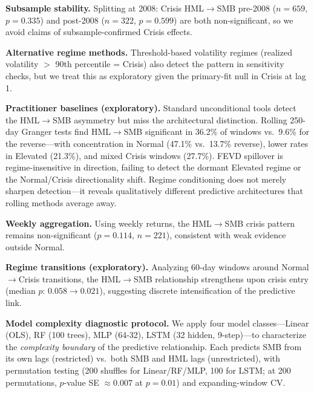 \documentclass[sigconf,anonymous]{acmart}
\begin{document}
\textbf{Subsample stability.} Splitting at 2008: Crisis HML$\to$SMB
pre-2008 ($n = 659$, $p = 0.335$) and post-2008 ($n = 322$, $p = 0.599$)
are both non-significant, so we avoid claims of subsample-confirmed Crisis effects.

\textbf{Alternative regime methods.} Threshold-based volatility regimes
(realized volatility $>$ 90th percentile = Crisis) also detect the pattern
in sensitivity checks, but we treat this as exploratory given the primary-fit
null in Crisis at lag 1.

\textbf{Practitioner baselines (exploratory).} Standard unconditional tools detect the HML$\to$SMB
asymmetry but miss the architectural distinction. Rolling 250-day Granger tests
find HML$\to$SMB significant in 36.2\% of windows vs.\ 9.6\% for the
reverse---with concentration in Normal (47.1\% vs.\ 13.7\% reverse),
lower rates in Elevated (21.3\%), and mixed Crisis windows (27.7\%).
FEVD spillover is regime-insensitive in direction,
failing to detect the dormant Elevated regime or the Normal/Crisis directionality
shift. Regime conditioning does not merely sharpen detection---it reveals
qualitatively different predictive architectures that rolling methods average away.

\textbf{Weekly aggregation.} Using weekly returns, the HML$\to$SMB crisis pattern
remains non-significant ($p = 0.114$, $n = 221$), consistent with weak
evidence outside Normal.

\textbf{Regime transitions (exploratory).} Analyzing 60-day windows around Normal$\to$Crisis
transitions, the HML$\to$SMB relationship strengthens upon crisis entry
(median $p$: $0.058 \to 0.021$), suggesting discrete intensification of the
predictive link.

\textbf{Model complexity diagnostic protocol.}
We apply four model classes---Linear (OLS), RF (100 trees), MLP (64-32),
LSTM (32 hidden, 9-step)---to characterize
the \emph{complexity boundary} of the predictive relationship.
Each predicts SMB from its own lags (restricted) vs.\ both SMB and
HML lags (unrestricted), with permutation testing
(200 shuffles for Linear/RF/MLP, 100 for LSTM; at 200 permutations,
$p$-value SE $\approx 0.007$ at $p = 0.01$) and expanding-window CV.
\end{document}
